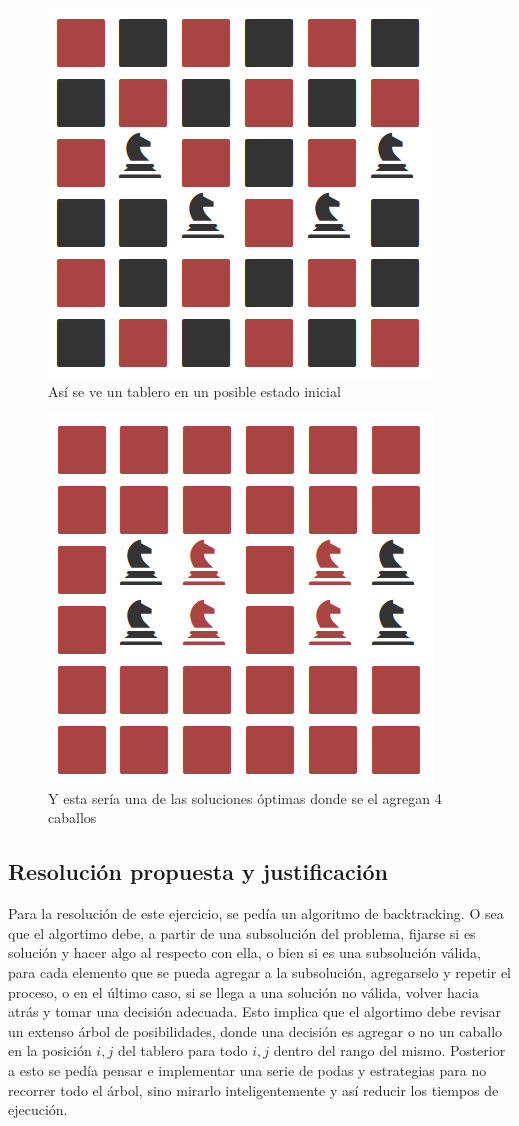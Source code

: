  \begin{figure}[h!]
   \begin{center}
 	\includegraphics[width=.4\linewidth]{imagenes/ej3/6x6init.png}
 	\caption{As\'i se ve un tablero en un posible estado inicial}
   \end{center}
 \end{figure}

 \begin{figure}[h!]
   \begin{center}
 	\includegraphics[width=.4\linewidth]{imagenes/ej3/6x6optima.png}
 	\caption{Y esta ser\'ia una de las soluciones \'optimas donde se el agregan 4 caballos}
   \end{center}
 \end{figure}

\newpage

\subsection{Resoluci\'on propuesta y justificaci\'on}
Para la resoluci\'on de este ejercicio, se ped\'ia un algoritmo de backtracking. O sea que el algortimo debe, a partir de una subsoluci\'on del problema, fijarse si es soluci\'on y hacer algo  al respecto con ella, o bien si es una subsoluci\'on v\'alida, para cada elemento que se pueda agregar a la subsoluci\'on, agregarselo y repetir el proceso, o en el \'ultimo caso, si se llega a una soluci\'on no v\'alida, volver hacia atr\'as y tomar una decisi\'on adecuada. Esto implica que el algortimo debe revisar un extenso \'arbol de posibilidades, donde una decisi\'on es agregar o no un caballo en la posici\'on $i, j$ del tablero para todo $i, j$ dentro del rango del mismo. Posterior a esto se ped\'ia pensar e implementar una serie de podas y estrategias para no recorrer todo el \'arbol, sino mirarlo inteligentemente y as\'i reducir los tiempos de ejecuci\'on.\\


